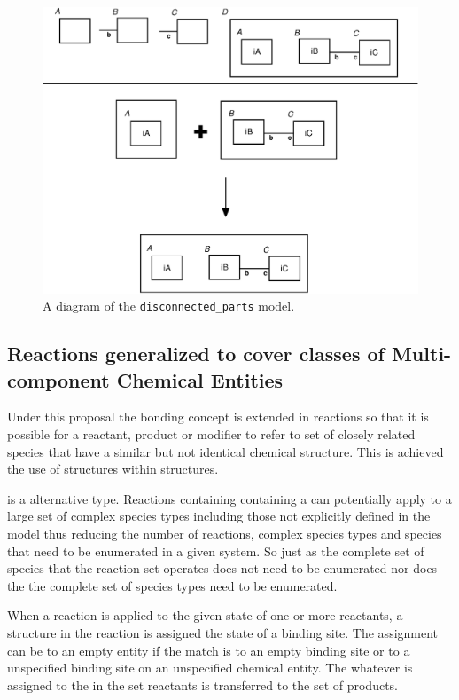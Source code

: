\documentclass{cekarticle}
\begin{document}
\begin{figure}[h]
  \vspace*{8pt}
  \centering
  \includegraphics[scale = 0.7]{disconnected_parts.eps}
  \caption{A diagram of the \texttt{disconnected\_parts} model.}
  \label{fig:disconnected_parts}
\end{figure}

\subsection{Reactions generalized to cover classes of Multi-component Chemical Entities}
\label{sec:generalizedreactions}

Under this proposal the bonding concept is extended in reactions so that it is possible 
for a reactant, product or modifier to refer to set of closely related species that have a 
similar but not identical chemical structure.  
This is achieved the use of  structures within 
structures.

 is a alternative  type.  Reactions containing containing a
 can potentially
apply to a large set of complex species types including those not explicitly defined in the model thus
reducing the number of reactions, complex species types and species that
need to be enumerated in a given system.  So just as the complete set of species that the reaction set
operates does not need to be enumerated nor does the the complete set of species types need to be
enumerated.

When a reaction is applied to the given state of one or more reactants, a  structure
in the reaction is assigned the state of a binding site.  The assignment can be to
an empty entity if the match is to an empty binding site or to a unspecified binding site on
an unspecified chemical entity.  The whatever is assigned to the 
in the set reactants is transferred to the set of products.
\end{document}
